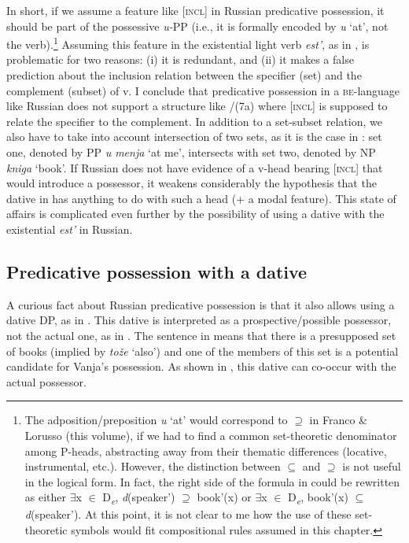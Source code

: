 \documentclass[output=paper,colorlinks,citecolor=brown]{./langscibook}
\begin{document}
In short, if we assume a feature like [\textsc{incl}] in Russian predicative possession, it should be part of the possessive \textit{u-}PP (i.e., it is formally encoded by \textit{u} ‘at’, not the verb).\footnote{The adposition/preposition \textit{u} ‘at’ would correspond to \textrm{${\supseteq}$} in Franco \& Lorusso (this volume), if we had to find a common set-theoretic denominator among P-heads, abstracting away from their thematic differences (locative, instrumental, etc.). However, the distinction between \textrm{${\subseteq}$} and \textrm{${\supseteq}$} is not useful in the logical form. In fact, the right side of the formula in  could be rewritten as either \textrm{${\exists}$}x \textrm{${\in}$} D\textit{\textsubscript{e}}, \textit{d}(speaker\textrm{'}) \textrm{${\supseteq}$} book\textrm{'}(x) or \textrm{${\exists}$}x \textrm{${\in}$} D\textit{\textsubscript{e}}, book\textrm{'}(x) \textrm{${\subseteq}$} \textit{d}(speaker\textrm{'}). At this point, it is not clear to me how the use of these set-theoretic symbols would fit compositional rules assumed in this chapter.}  Assuming this feature in the existential light verb \textit{est’}, as in , is problematic for two reasons: (i) it is redundant, and (ii) it makes a false prediction about the inclusion relation between the specifier (set) and the complement (subset) of v. I conclude that predicative possession in a \textsc{be}{}-language like Russian does not support a structure like /(7a) where [\textsc{incl}] is supposed to relate the specifier to the complement. In addition to a set-subset relation, we also have to take into account intersection of two sets, as it is the case in : set one, denoted by PP \textit{u menja} ‘at me’, intersects with set two, denoted by NP \textit{kniga} ‘book’. If Russian does not have evidence of a v-head bearing [\textsc{incl}] that would introduce a possessor, it weakens considerably the hypothesis that the dative in  has anything to do with such a head (+ a modal feature). This state of affairs is complicated even further by the possibility of using a dative with the existential \textit{est’} in Russian.

\subsection{Predicative possession with a dative}\label{sec:tsedryk:2.3}

A curious fact about Russian predicative possession is that it also allows using a dative DP, as in . This dative is interpreted as a prospective/possible possessor, not the actual one, as in . The sentence in  means that there is a presupposed set of books (implied by \textit{tože} ‘also’) and one of the members of this set is a potential candidate for Vanja’s possession. As shown in , this dative can co-occur with the actual possessor. 
\end{document}

